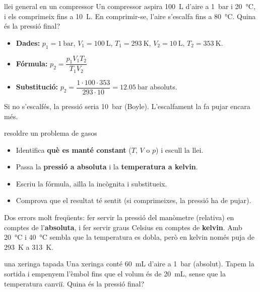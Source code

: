 \begin{exemple}{llei general en un compressor}
Un compressor aspira \SI{100}{\liter} d'aire a \SI{1}{\bar} i \SI{20}{\degreeCelsius}, i els comprimeix fins a \SI{10}{\liter}. En comprimir-se, l'aire s'escalfa fins a \SI{80}{\degreeCelsius}. Quina és la pressió final?
\begin{itemize}
 \item \textbf{Dades:} $p_1 = \SI{1}{\bar}$, $V_1 = \SI{100}{\liter}$, $T_1 = \SI{293}{\kelvin}$, $V_2 = \SI{10}{\liter}$, $T_2 = \SI{353}{\kelvin}$.
 \item \textbf{Fórmula:} $p_2 = \dfrac{p_1 V_1 T_2}{T_1 V_2}$
 \item \textbf{Substitució:} $p_2 = \dfrac{1 \cdot 100 \cdot 353}{293 \cdot 10} = \SI{12,05}{\bar}$ absoluts.
\end{itemize}
Si no s'escalfés, la pressió seria \SI{10}{\bar} (Boyle). L'escalfament la fa pujar encara més.
\end{exemple}

\begin{metode}{resoldre un problema de gasos}
\begin{itemize}
 \item \textbf{} Identifica \textbf{què es manté constant} ($T$, $V$ o $p$) i escull la llei.
 \item \textbf{} Passa la \textbf{pressió a absoluta} i la \textbf{temperatura a kelvin}.
 \item \textbf{} Escriu la fórmula, aïlla la incògnita i substitueix.
 \item \textbf{} Comprova que el resultat té sentit (si comprimeixes, la pressió ha de pujar).
\end{itemize}
\end{metode}

\begin{atencio}
Dos errors molt freqüents: fer servir la pressió del manòmetre (relativa) en comptes de l'\textbf{absoluta}, i fer servir graus Celsius en comptes de \textbf{kelvin}. Amb \SI{20}{\degreeCelsius} i \SI{40}{\degreeCelsius} sembla que la temperatura es dobla, però en kelvin només puja de \SI{293}{\kelvin} a \SI{313}{\kelvin}.
\end{atencio}

\begin{guiada}{una xeringa tapada}
Una xeringa conté \SI{60}{\milli\liter} d'aire a \SI{1}{\bar} (absolut). Tapem la sortida i empenyem l'èmbol fins que el volum és de \SI{20}{\milli\liter}, sense que la temperatura canviï. Quina és la pressió final?
\end{guiada}


